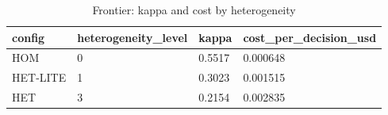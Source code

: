 \begin{table}[t]\centering
\caption{Frontier: kappa and cost by heterogeneity}
\begin{tabular}{llll}
\toprule
config & heterogeneity\_level & kappa & cost\_per\_decision\_usd \\
\midrule
HOM & 0 & 0.5517 & 0.000648 \\
HET-LITE & 1 & 0.3023 & 0.001515 \\
HET & 3 & 0.2154 & 0.002835 \\
\bottomrule
\end{tabular}
\end{table}
